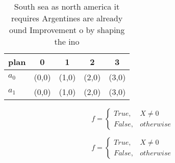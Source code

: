 \documentclass[a4paper]{article}
\begin{document}
\begin{table}
\begin{adjustbox}{width=0.5\columnwidth}
\begin{tabular}{|l|l|l|l|l|}
\hline
\textbf{plan} & \multicolumn{1}{c|}{\textbf{0}} & \multicolumn{1}{c|}{\textbf{1}} & \multicolumn{1}{c|}{\textbf{2}} & \multicolumn{1}{c|}{\textbf{3}} \\ \hline
\textbf{$a_0$}  & (0,0) & (1,0) & (2,0) & (3,0) \\ \hline
\textbf{$a_1$}  & (0,0) & (1,0) & (2,0) & (3,0) \\ \hline
\end{tabular}
\end{adjustbox}
\caption{South sea as north america it requires Argentines are already ound Improvement o by shaping the ino
}
\end{table}

\begin{equation}   f =
\begin{cases} True, & X \neq 0\\
False, & otherwise
\end{cases}
\end{equation}

\begin{equation}   f =
\begin{cases} True, & X \neq 0\\
False, & otherwise
\end{cases}
\end{equation}
\end{document}
